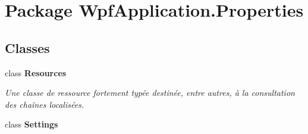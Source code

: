 \hypertarget{namespace_wpf_application_1_1_properties}{\section{Package Wpf\-Application.\-Properties}
\label{namespace_wpf_application_1_1_properties}
}
\subsection*{Classes}
\begin{DoxyCompactItemize}
\item 
class {\bfseries Resources}
\begin{DoxyCompactList}\small\item\em Une classe de ressource fortement typée destinée, entre autres, à la consultation des chaînes localisées. \end{DoxyCompactList}\item 
class {\bfseries Settings}
\end{DoxyCompactItemize}
